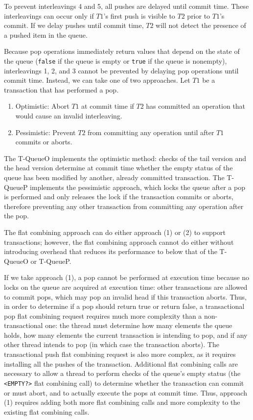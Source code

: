 To prevent interleavings 4 and 5, all pushes are delayed until commit time. These interleavings can occur only if $T1$'s first push is visible to $T2$ prior to $T1$'s commit. If we delay pushes until commit time, $T2$ will not detect the presence of a pushed item in the queue.

Because pop operations immediately return values that depend on the state of the queue (\texttt{false} if the queue is empty or \texttt{true} if the queue is nonempty), interleavings 1, 2, and 3 cannot be prevented by delaying pop operations until commit time. Instead, we can take one of two approaches. Let $T1$ be a transaction that has performed a pop.
\begin{enumerate}
    \item Optimistic: Abort $T1$ at commit time if $T2$ has committed an operation that would cause an invalid interleaving.
    \item Pessimistic: Prevent $T2$ from committing any operation until after $T1$ commits or aborts.
\end{enumerate}

The T-QueueO implements the optimistic method: checks of the tail version and the head version determine at commit time whether the empty status of the queue has been modified by another, already committed transaction. The T-QueueP implements the pessimistic approach, which locks the queue after a pop is performed and only releases the lock if the transaction commits or aborts, therefore preventing any other transaction from committing any operation after the pop.

The flat combining approach can do either approach (1) or (2) to support transactions; however, the flat combining approach cannot do either without introducing overhead that reduces its performance to below that of the T-QueueO or T-QueueP.

If we take approach (1), a pop cannot be performed at execution time because no locks on the queue are acquired at execution time: other transactions are allowed to commit pops, which may pop an invalid head if this transaction aborts. Thus, in order to determine if a pop should return true or return false, a transactional pop flat combining request requires much more complexity than a non-transactional one: the thread must determine how many elements the queue holds, how many elements the current transaction is intending to pop, and if any other thread intends to pop (in which case the transaction aborts). The transactional push flat combining request is also more complex, as it requires installing all the pushes of the transaction. Additional flat combining calls are necessary to allow a thread to perform checks of the queue's empty status (the \texttt{<EMPTY?>} flat combining call) to determine whether the transaction can commit or must abort, and to actually execute the pops at commit time. Thus, approach (1) requires adding both more flat combining calls and more complexity to the existing flat combining calls.

